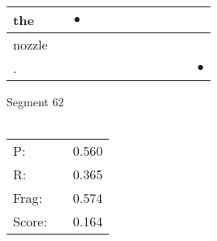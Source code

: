 \documentclass[landscape]{article}
\newcommand{\ssp}{\hspace{2pt}}
\newcommand{\mex}{\cellcolor{g}$\bullet$}
\begin{document}
\begin{tabular}{|l|p{10pt}|p{10pt}|p{10pt}|p{10pt}|p{10pt}|p{10pt}|p{10pt}|p{10pt}|p{10pt}|p{10pt}|p{10pt}|}
\hline
\ssp \cellcolor{ref1}the \ssp&\hspace{2pt}&\hspace{2pt}\mex&\hspace{2pt}&\hspace{2pt}&\hspace{2pt}&\hspace{2pt}&\hspace{2pt}&\hspace{2pt}&\hspace{2pt}&\hspace{2pt}&\hspace{2pt}\\
\hline
\ssp nozzle \ssp&\hspace{2pt}&\hspace{2pt}&\hspace{2pt}&\hspace{2pt}&\hspace{2pt}&\hspace{2pt}&\hspace{2pt}&\hspace{2pt}&\hspace{2pt}&\hspace{2pt}&\hspace{2pt}\\
\hline
\ssp \cellcolor{ref10}. \ssp&\hspace{2pt}&\hspace{2pt}&\hspace{2pt}&\hspace{2pt}&\hspace{2pt}&\hspace{2pt}&\hspace{2pt}&\hspace{2pt}&\hspace{2pt}&\hspace{2pt}&\hspace{2pt}\mex\\
\hline
\end{tabular}

\vspace{6pt}
\noindent Segment 62\\\\
\noindent\begin{tabular}{lm{12pt}r}
\hline
P:&&0.560\\
R:&&0.365\\
Frag:&&0.574\\
Score:&&0.164\\
\end{tabular}
\end{document}
